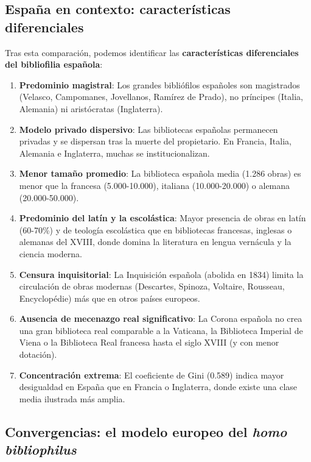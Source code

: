 \documentclass[11pt,a4paper]{article}
\begin{document}
\subsection{España en contexto: características diferenciales}

Tras esta comparación, podemos identificar las \textbf{características diferenciales del bibliofilia española}:

\begin{enumerate}
\item \textbf{Predominio magistral}: Los grandes bibliófilos españoles son magistrados (Velasco, Campomanes, Jovellanos, Ramírez de Prado), no príncipes (Italia, Alemania) ni aristócratas (Inglaterra).

\item \textbf{Modelo privado dispersivo}: Las bibliotecas españolas permanecen privadas y se dispersan tras la muerte del propietario. En Francia, Italia, Alemania e Inglaterra, muchas se institucionalizan.

\item \textbf{Menor tamaño promedio}: La biblioteca española media (1.286 obras) es menor que la francesa (5.000-10.000), italiana (10.000-20.000) o alemana (20.000-50.000).

\item \textbf{Predominio del latín y la escolástica}: Mayor presencia de obras en latín (60-70\%) y de teología escolástica que en bibliotecas francesas, inglesas o alemanas del XVIII, donde domina la literatura en lengua vernácula y la ciencia moderna.

\item \textbf{Censura inquisitorial}: La Inquisición española (abolida en 1834) limita la circulación de obras modernas (Descartes, Spinoza, Voltaire, Rousseau, Encyclopédie) más que en otros países europeos.

\item \textbf{Ausencia de mecenazgo real significativo}: La Corona española no crea una gran biblioteca real comparable a la Vaticana, la Biblioteca Imperial de Viena o la Biblioteca Real francesa hasta el siglo XVIII (y con menor dotación).

\item \textbf{Concentración extrema}: El coeficiente de Gini (0.589) indica mayor desigualdad en España que en Francia o Inglaterra, donde existe una clase media ilustrada más amplia.
\end{enumerate}

\subsection{Convergencias: el modelo europeo del \textit{homo bibliophilus}}
\end{document}
